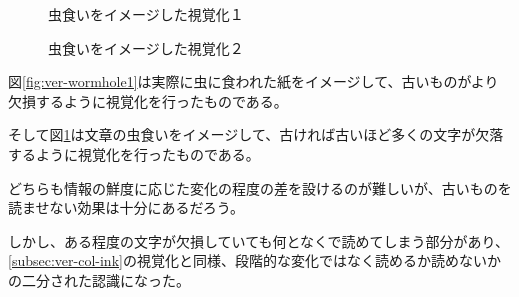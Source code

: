 \begin{figure}[htbp]
  \begin{minipage}{0.5\hsize}
    \begin{center}
    \end{center}
    \caption{虫食いをイメージした視覚化１}
    \label{fig:ver-wormhole1}
  \end{minipage}
  \begin{minipage}{0.5\hsize}
    \begin{center}
    \end{center}
    \caption{虫食いをイメージした視覚化２}
    \label{fig:ver-wormhole2}
  \end{minipage}
\end{figure}

図\ref{fig:ver-wormhole1}は実際に虫に食われた紙をイメージして、古いものがより欠損するように視覚化を行ったものである。

そして図\ref{fig:ver-wormhole2}は文章の虫食いをイメージして、古ければ古いほど多くの文字が欠落するように視覚化を行ったものである。

どちらも情報の鮮度に応じた変化の程度の差を設けるのが難しいが、古いものを読ませない効果は十分にあるだろう。

しかし、ある程度の文字が欠損していても何となくで読めてしまう部分があり、\ref{subsec:ver-col-ink}の視覚化と同様、段階的な変化ではなく読めるか読めないかの二分された認識になった。

